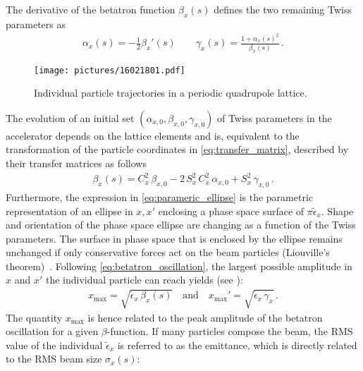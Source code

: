 The derivative of the betatron function $\beta_x(s)$ defines the two remaining Twiss parameters as
\begin{align}
\alpha_x(s) = - \frac{1}{2} \beta_x'(s) \quad \quad \gamma_x(s) = \frac{1+\alpha_x(s)^2}{\beta_x(s)} \, .
\end{align}

%
\begin{figure}[b]  
    \centering
    \texttt{[image: pictures/16021801.pdf]}
    \caption{Individual particle trajectories in a periodic quadrupole lattice.}  
    \label{pic:16021801}
\end{figure}

The evolution of an initial set $(\alpha_{x,0},\beta_{x,0},\gamma_{x,0})$ of Twiss parameters in the accelerator depends on the lattice elements and is, equivalent to the transformation of the particle coordinates in \eqref{eq:transfer_matrix}, described by their transfer matrices as follows
%
\begin{align}
  \beta_x(s) = C_x^2 \, \beta_{x,0} -2 \, S_x^2 \, C_x^2 \, \alpha_{x,0} + S_x^2 \, \gamma_{x,0} \, .
\end{align}
%
Furthermore, the expression in \eqref{eq:parameric_ellipse} is the parametric representation of an ellipse in $x,x'$ enclosing a phase space surface of $\pi \tilde{\epsilon}_x$. Shape and orientation of the phase space ellipse are changing as a function of the Twiss parameters. The surface in phase space that is enclosed by the ellipse remains unchanged if only conservative forces act on the beam particles (Liouville's theorem)~\cite{wiedemann1999particle}. Following \eqref{eq:betatron_oscillation}, the largest possible amplitude in $x$ and $x'$ the individual particle can reach yields (see ):
%
\begin{align}
  x_\text{max} = \sqrt{\tilde{\epsilon}_x \, \beta_x(s)} \quad \text{and} \quad x_\text{max}' = \sqrt{\tilde{\epsilon}_x \, \gamma_x} \, .
\end{align}
%
The quantity $x_\text{max}$ is hence related to the peak amplitude of the betatron oscillation for a given $\beta$-function. If many particles compose the beam, the RMS value of the individual $\tilde{\epsilon}_x$ is referred to as the emittance, which is directly related to the RMS beam size $\sigma_x(s)$:
%
%
